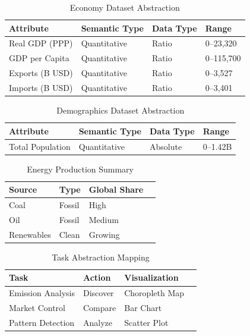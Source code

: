 \documentclass[conference]{IEEEtran}
\begin{document}
\begin{table}[htbp]
\centering
\caption{Economy Dataset Abstraction}
\small
\begin{tabular}{|l|l|l|l|}
\hline
\textbf{Attribute} & \textbf{Semantic Type} & \textbf{Data Type} & \textbf{Range} \\
\hline
Real GDP (PPP) & Quantitative & Ratio & 0--23,320 \\
GDP per Capita & Quantitative & Ratio & 0--115,700 \\
Exports (B USD) & Quantitative & Ratio & 0--3,527 \\
Imports (B USD) & Quantitative & Ratio & 0--3,401 \\
\hline
\end{tabular}
\end{table}

\begin{table}[htbp]
\centering
\caption{Demographics Dataset Abstraction}
\small
\begin{tabular}{|l|l|l|l|}
\hline
\textbf{Attribute} & \textbf{Semantic Type} & \textbf{Data Type} & \textbf{Range} \\
\hline
Total Population & Quantitative & Absolute & 0--1.42B \\
\hline
\end{tabular}
\end{table}

\begin{table}[htbp]
\centering
\caption{Energy Production Summary}
\small
\begin{tabular}{|l|l|l|l}
\hline
Source & Type & Global Share \\
\hline
Coal & Fossil & High \\
Oil & Fossil & Medium \\
Renewables & Clean & Growing \\
\hline
\end{tabular}
\end{table}

\begin{table}[htbp]
\centering
\caption{Task Abstraction Mapping}
\small
\begin{tabular}{|l|l|l|l}
\hline
Task & Action & Visualization \\
\hline
Emission Analysis & Discover & Choropleth Map \\
Market Control & Compare & Bar Chart \\
Pattern Detection & Analyze & Scatter Plot \\
\hline
\end{tabular}
\end{table}
\end{document}
